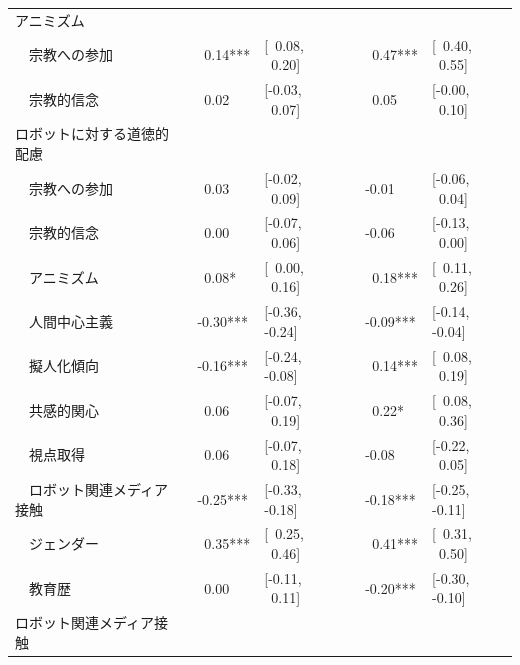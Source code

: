 \documentclass[a4j,12pt]{jreport}
\begin{document}
\begin{table}[H]
{\begin{threeparttable}
\begin{tabular}{@{}lllllll@{}}
アニミズム                             &  &                               &                      &  &                               &                      \\
~~宗教への参加            &  & ~0.14***                     & {[}~0.08, ~0.20{]} &  & ~0.47***                     & {[}~0.40, ~0.55{]} \\
~~宗教的信念            &  & ~0.02                        & {[}-0.03, ~0.07{]}  &  & ~0.05                        & {[}-0.00, ~0.10{]}  \\
ロボットに対する道徳的配慮               &  &                               &                      &  &                               &                      \\
~~宗教への参加            &  & ~0.03                        & {[}-0.02, ~0.09{]}  &  & -0.01                         & {[}-0.06, ~0.04{]}  \\
~~宗教的信念            &  & ~0.00                             & {[}-0.07, ~0.06{]}  &  & -0.06                         & {[}-0.13, ~0.00{]}  \\
~~アニミズム                         &  & ~0.08* & {[}~0.00, ~0.16{]} &  & ~0.18***                     & {[}~0.11, ~0.26{]} \\
~~人間中心主義           &  & -0.30***                      & {[}-0.36, -0.24{]}   &  & -0.09***                      & {[}-0.14, -0.04{]}   \\
~~擬人化傾向              &  & -0.16***                      & {[}-0.24, -0.08{]}   &  & ~0.14***                     & {[}~0.08, ~0.19{]} \\
~~共感的関心                &  & ~0.06                        & {[}-0.07, ~0.19{]}  &  & ~0.22* & {[}~0.08, ~0.36{]} \\
~~視点取得              &  & ~0.06                        & {[}-0.07, ~0.18{]}  &  & -0.08                         & {[}-0.22, ~0.05{]}  \\
~~ロボット関連メディア接触 &  & -0.25***                      & {[}-0.33, -0.18{]}   &  & -0.18***                      & {[}-0.25, -0.11{]}   \\
~~ジェンダー                          &  & ~0.35***                     & {[}~0.25, ~0.46{]} &  & ~0.41***                     & {[}~0.31, ~0.50{]} \\
~~教育歴                       &  & ~0.00                            & {[}-0.11, ~0.11{]}  &  & -0.20***                      & {[}-0.30, -0.10{]}   \\
ロボット関連メディア接触     &  &                               &                      &  &                               &                      \\

\end{tabular}
\end{threeparttable}}
\end{table}
\end{document}
